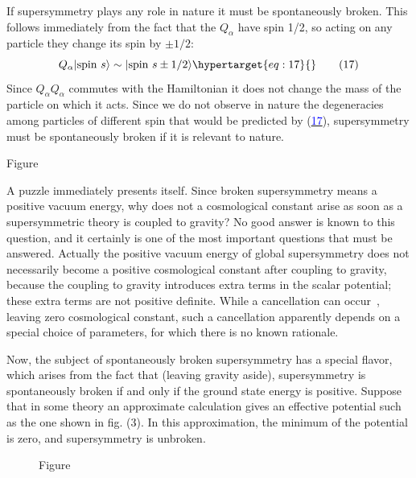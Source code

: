 \documentclass[11pt,a4paper]{article}
\newcommand{\eqtarget}[1]{\hypertarget{eq:#1}{\mathstrut}\tag{#1}}
\newcommand{\eqnref}[1]{(\hyperlink{eq:#1}{\textcolor{blue}{#1}})}
\begin{document}
If supersymmetry plays any role in nature it must be spontaneously
broken. This follows immediately from the fact that the $Q_\alpha$
have spin 1/2, so acting on any particle they change its spin by $\pm 1/2$:
\begin{equation}
Q_\alpha |\text{spin } s\rangle \sim |\text{spin } s \pm 1/2\rangle
\eqtarget{17}
\end{equation}
Since $Q_\alpha Q_\alpha$ commutes with the Hamiltonian it does not change the mass
of the particle on which it acts. Since we do not observe in nature
the degeneracies among particles of different spin that would be predicted
by \eqnref{17}, supersymmetry must be spontaneously broken if it is
relevant to nature.

\begin{center}

\par\smallskip
Figure~\thefigure
\end{center}

A puzzle immediately presents itself. Since broken supersymmetry
means a positive vacuum energy, why does not a cosmological
constant arise as soon as a supersymmetric theory is coupled to
gravity? No good answer is known to this question, and it certainly
is one of the most important questions that must be answered. Actually
the positive vacuum energy of global supersymmetry does not necessarily
become a positive cosmological constant after coupling to
gravity, because the coupling to gravity introduces extra terms in
the scalar potential; these extra terms are not positive definite.
While a cancellation can occur~\cite{ref5}, leaving zero cosmological constant,
such a cancellation apparently depends on a special choice of parameters,
for which there is no known rationale.

Now, the subject of spontaneously broken supersymmetry has a
special flavor, which arises from the fact that (leaving gravity
aside), supersymmetry is spontaneously broken if and only if the
ground state energy is positive. Suppose that in some theory an approximate
calculation gives an effective potential such as the one
shown in fig. (3). In this approximation, the minimum of the potential
is zero, and supersymmetry is unbroken.

\begin{figure}
\vspace{-0.5\baselineskip}
\centering

\par\smallskip
Figure~\thefigure
\vspace{-0.9\baselineskip}
\end{figure}
\end{document}
